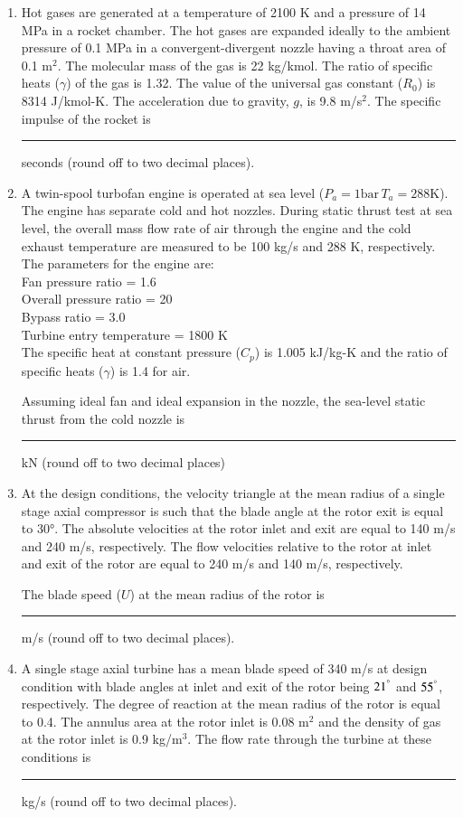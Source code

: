 \documentclass[journal,12pt,onecolumn]{IEEEtran}
\theoremstyle{remark}
\begin{document}
\begin{enumerate}
\item Hot gases are generated at a temperature of 2100 K and a pressure of 14 MPa in a rocket chamber. The hot gases are expanded ideally to the ambient pressure of 0.1 MPa in a convergent-divergent nozzle having a throat area of 0.1 m$^2$. The molecular mass of the gas is 22 kg/kmol. The ratio of specific heats ($\gamma$) of the gas is 1.32. The value of the universal gas constant ($R_0$) is 8314 J/kmol-K. The acceleration due to gravity, $g$, is 9.8 m/s$^2$. The specific impulse of the rocket is \rule{1.5cm}{0.4pt} seconds (round off to two decimal places).

\item A twin-spool turbofan engine is operated at sea level ($P_a = 1 \text{bar}\, T_a = 288 \text{K}$). The engine has separate cold and hot nozzles. During static thrust test at sea level, the overall mass flow rate of air through the engine and the cold exhaust temperature are measured to be 100 kg/s and 288 K, respectively. The parameters for the engine are:\\
    Fan pressure ratio = 1.6\\
    Overall pressure ratio = 20\\
    Bypass ratio = 3.0\\
    Turbine entry temperature = 1800 K\\
The specific heat at constant pressure ($C_p$) is 1.005 kJ/kg-K and the ratio of specific heats ($\gamma$) is 1.4 for air.

Assuming ideal fan and ideal expansion in the nozzle, the sea-level static thrust from the cold nozzle is \rule{1.5cm}{0.4pt}kN (round off to two decimal places)

\item At the design conditions, the velocity triangle at the mean radius of a single stage axial compressor is such that the blade angle at the rotor exit is equal to 30°. The absolute velocities at the rotor inlet and exit are equal to 140 m/s and 240 m/s, respectively. The flow velocities relative to the rotor at inlet and exit of the rotor are equal to 240 m/s and 140 m/s, respectively.



The blade speed (\(U\)) at the mean radius of the rotor is \rule{1.5cm}{0.4pt}m/s (round off to two decimal places).

\item A single stage axial turbine has a mean blade speed of 340 m/s at design condition with blade angles at inlet and exit of the rotor being $21^\degree$ and $55^\degree$, respectively. The degree of reaction at the mean radius of the rotor is equal to 0.4. The annulus area at the rotor inlet is 0.08 m$^2$ and the density of gas at the rotor inlet is 0.9 kg/m$^3$. The flow rate through the turbine at these conditions is \rule{2cm}{0.4pt} kg/s (round off to two decimal places).


\end{enumerate}
\end{document}
